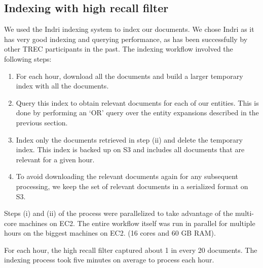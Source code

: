 \subsection{Indexing with high recall filter}
	We used the Indri indexing system to index our documents. We chose Indri as it has very good indexing and querying performance, as has been successfully by other TREC participants in the past. 
The indexing workflow involved the following steps:
\begin{enumerate}
\item For each hour, download all the documents and build a larger temporary index with all the documents. 
\item Query this index to obtain relevant documents for each of our entities. This is done by performing an ‘OR’ query over the entity expansions described in the previous section. 
\item Index only the documents retrieved in step (ii) and delete the temporary index. This index is backed up on S3 and includes all documents that are relevant for a given hour. 
\item To avoid downloading the relevant documents again for any subsequent processing, we keep the set of relevant documents in a serialized format on S3.  
\end{enumerate}
Steps (i) and (ii) of the process were parallelized to take advantage of the multi-core machines on EC2. The entire workflow itself was run in parallel for multiple hours on the biggest machines on EC2. (16 cores and 60 GB RAM).

For each hour, the high recall filter captured about 1 in every 20 documents. The indexing process took five minutes on average to process each hour. 
